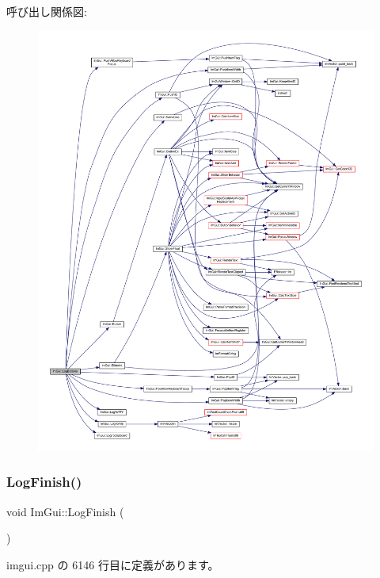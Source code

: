 呼び出し関係図\+:\nopagebreak
\begin{figure}[H]
\begin{center}
\leavevmode
\includegraphics[width=350pt]{namespace_im_gui_a7bd295da4be19bab98262c76fcaeb4fb_cgraph}
\end{center}
\end{figure}
\mbox{\label{namespace_im_gui_a2ebcd048d1ca025fb972e1c2e920e3f3}} 
\subsubsection{\texorpdfstring{Log\+Finish()}{LogFinish()}}
{\footnotesize\ttfamily void Im\+Gui\+::\+Log\+Finish (\begin{DoxyParamCaption}{ }\end{DoxyParamCaption})}



 imgui.\+cpp の 6146 行目に定義があります。

